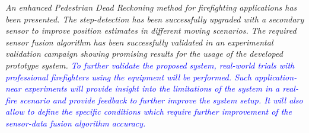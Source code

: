 \documentclass{article}
\begin{document}
\begin{itemize}
\textit{An enhanced Pedestrian Dead Reckoning method for firefighting applications has been presented. The step-detection  has been successfully upgraded with a secondary sensor to improve  position estimates in different moving scenarios. The required sensor fusion algorithm has been successfully  validated in an experimental validation campaign showing promising results for the usage of the developed prototype system.  \textcolor{blue}{To further validate the proposed  system, real-world trials with professional firefighters using the equipment will  be performed. Such application-near experiments will provide insight into the limitations of the system in a real-fire scenario and provide feedback to further improve the system setup. It will also allow to define the specific conditions which require further improvement of the sensor-data fusion algorithm accuracy.}}



\end{itemize}





\end{document}
